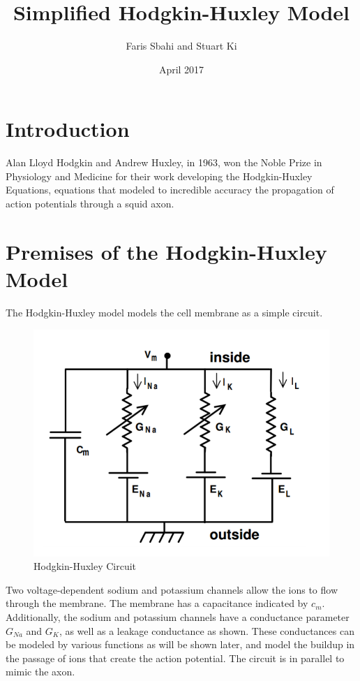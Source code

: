 \documentclass{article}
\title{Simplified Hodgkin-Huxley Model}
\author{Faris Sbahi and Stuart Ki}
\date{April 2017}
\begin{document}
\maketitle

\section{Introduction}

Alan Lloyd Hodgkin and Andrew Huxley, in 1963, won the Noble Prize in Physiology and Medicine for their work developing the Hodgkin-Huxley Equations, equations that modeled to incredible accuracy the propagation of action potentials through a squid axon. 

\section{Premises of the Hodgkin-Huxley Model}

The Hodgkin-Huxley model models the cell membrane as a simple circuit. 

\begin{figure}[h]
    \centering
    \includegraphics[scale=0.5]{hhmodel}
    \caption{Hodgkin-Huxley Circuit}
    \label{fig:my_label}
\end{figure}


Two voltage-dependent sodium and potassium channels allow the ions to flow through the membrane. The membrane has a capacitance indicated by $c_m$. Additionally, the sodium and potassium channels have a conductance parameter $G_{Na}$ and $G_K$, as well as a leakage conductance as shown. These conductances can be modeled by various functions as will be shown later, and model the buildup in the passage of ions that create the action potential. The circuit is in parallel to mimic the axon. 
\end{document}
